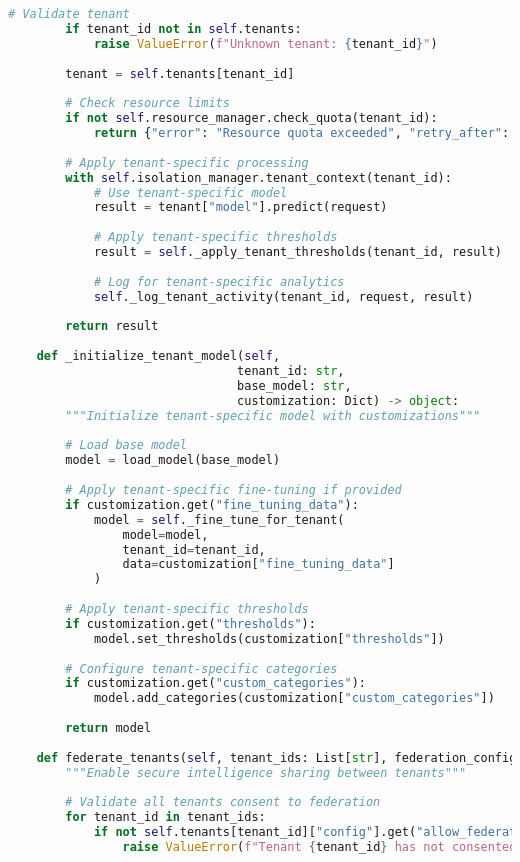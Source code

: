 \documentclass[11pt,a4paper]{article}
\begin{document}
\begin{lstlisting}[language=Python, caption=Multi-Tenant CPF Implementation]
        # Validate tenant
        if tenant_id not in self.tenants:
            raise ValueError(f"Unknown tenant: {tenant_id}")
        
        tenant = self.tenants[tenant_id]
        
        # Check resource limits
        if not self.resource_manager.check_quota(tenant_id):
            return {"error": "Resource quota exceeded", "retry_after": 60}
        
        # Apply tenant-specific processing
        with self.isolation_manager.tenant_context(tenant_id):
            # Use tenant-specific model
            result = tenant["model"].predict(request)
            
            # Apply tenant-specific thresholds
            result = self._apply_tenant_thresholds(tenant_id, result)
            
            # Log for tenant-specific analytics
            self._log_tenant_activity(tenant_id, request, result)
        
        return result
    
    def _initialize_tenant_model(self, 
                                tenant_id: str,
                                base_model: str,
                                customization: Dict) -> object:
        """Initialize tenant-specific model with customizations"""
        
        # Load base model
        model = load_model(base_model)
        
        # Apply tenant-specific fine-tuning if provided
        if customization.get("fine_tuning_data"):
            model = self._fine_tune_for_tenant(
                model=model,
                tenant_id=tenant_id,
                data=customization["fine_tuning_data"]
            )
        
        # Apply tenant-specific thresholds
        if customization.get("thresholds"):
            model.set_thresholds(customization["thresholds"])
        
        # Configure tenant-specific categories
        if customization.get("custom_categories"):
            model.add_categories(customization["custom_categories"])
        
        return model
    
    def federate_tenants(self, tenant_ids: List[str], federation_config: Dict):
        """Enable secure intelligence sharing between tenants"""
        
        # Validate all tenants consent to federation
        for tenant_id in tenant_ids:
            if not self.tenants[tenant_id]["config"].get("allow_federation", False):
                raise ValueError(f"Tenant {tenant_id} has not consented to federation")
        

\end{lstlisting}
\end{document}
